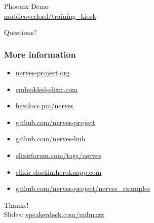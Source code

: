 \documentclass[10pt,xcolor=pdflatex,dvipsnames,table]{beamer}
\begin{document}
\begin{frame}[c,standout]
  \huge
  {
    \color{white} Phoenix Demo \\
    \large{\faGithub \hspace{1pt} \href{https://github.com/mobileoverlord/training_kiosk}{mobileoverlord/training\_kiosk}}
  }
\end{frame}

\begin{frame}[c,standout]
  \huge
  {\color{white} Questions?}
\end{frame}

\begin{frame}
\frametitle{More information}
\begin{itemize}
  \item
    \href{https://nerves-project.org/}{nerves-project.org}
  \item
    \href{https://embedded-elixir.com/}{embedded-elixir.com}
\item
    \href{https://hexdocs.pm/nerves}{hexdocs.pm/nerves}
\item
  \href{https://github.com/nerves-project}{github.com/nerves-project}
\item
  \href{https://github.com/nerves-hub}{github.com/nerves-hub}
\item
  \href{https://elixirforum.com/tags/nerves}{elixirforum.com/tags/nerves}
\item
  \href{https://elixir-slackin.herokuapp.com/}{elixir-slackin.herokuapp.com}
\item
  \href{https://github.com/nerves-project/nerves_examples}{github.com/nerves-project/nerves\_examples}
\end{itemize}
\end{frame}

\begin{frame}[c,standout]
  \huge
  {\color{white}Thanks! \\
    \large{Slides: \hspace{1pt} \href{https://speakerdeck.com/milmazz}{speakerdeck.com/milmazz}}
  }
\end{frame}
\end{document}
